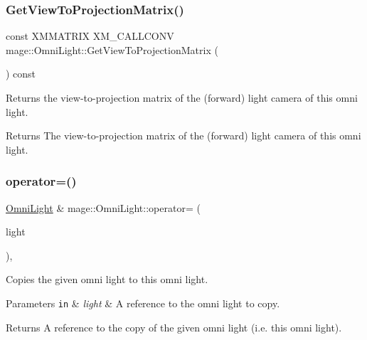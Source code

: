 \subsubsection{\texorpdfstring{Get\+View\+To\+Projection\+Matrix()}{GetViewToProjectionMatrix()}}
{\footnotesize\ttfamily const X\+M\+M\+A\+T\+R\+IX X\+M\+\_\+\+C\+A\+L\+L\+C\+O\+NV mage\+::\+Omni\+Light\+::\+Get\+View\+To\+Projection\+Matrix (\begin{DoxyParamCaption}{ }\end{DoxyParamCaption}) const\hspace{0.3cm}{\ttfamily [noexcept]}}

Returns the view-\/to-\/projection matrix of the (forward) light camera of this omni light.

\begin{DoxyReturn}{Returns}
The view-\/to-\/projection matrix of the (forward) light camera of this omni light. 
\end{DoxyReturn}
\hypertarget{classmage_1_1_omni_light_a4c88b169df94819f394967f2e3ebf2f3}{}\label{classmage_1_1_omni_light_a4c88b169df94819f394967f2e3ebf2f3} 
\subsubsection{\texorpdfstring{operator=()}{operator=()}\hspace{0.1cm}{\footnotesize\ttfamily [1/2]}}
{\footnotesize\ttfamily \hyperlink{classmage_1_1_omni_light}{Omni\+Light} \& mage\+::\+Omni\+Light\+::operator= (\begin{DoxyParamCaption}\item[{const \hyperlink{classmage_1_1_omni_light}{Omni\+Light} \&}]{light }\end{DoxyParamCaption})\hspace{0.3cm}{\ttfamily [default]}, {\ttfamily [noexcept]}}

Copies the given omni light to this omni light.


\begin{DoxyParams}[1]{Parameters}
\mbox{\tt in}  & {\em light} & A reference to the omni light to copy. \\
\hline
\end{DoxyParams}
\begin{DoxyReturn}{Returns}
A reference to the copy of the given omni light (i.\+e. this omni light). 
\end{DoxyReturn}
\hypertarget{classmage_1_1_omni_light_a92225bb01b879ec38f193d7abbc0543e}{}\label{classmage_1_1_omni_light_a92225bb01b879ec38f193d7abbc0543e} 
